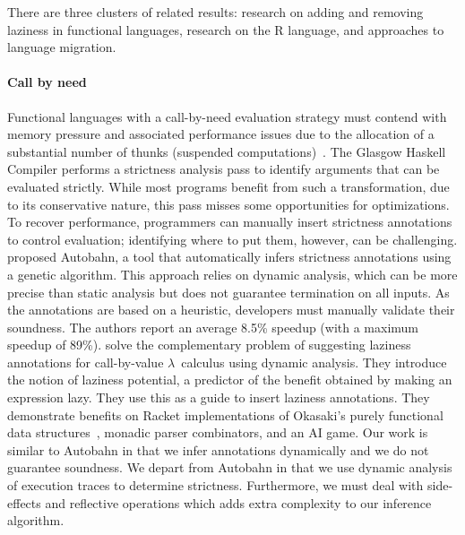 \documentclass[review,screen,acmsmall]{acmart}
\begin{document}
There are three clusters of related results: research on adding and removing
laziness in functional languages, research on the R language, and approaches to
language migration.

\paragraph{Call by need} Functional languages with a call-by-need evaluation
strategy must contend with memory pressure and associated performance issues due
to the allocation of a substantial number of thunks (suspended
computations)~\cite{transformopt,stricteffective,opteval}. The Glasgow Haskell
Compiler performs a strictness analysis pass to identify arguments that can be
evaluated strictly. While most programs benefit from such a transformation, due
to its conservative nature, this pass misses some opportunities for
optimizations. To recover performance, programmers can manually insert
strictness annotations to control evaluation; identifying where to put them,
however, can be challenging. \citet{autobahn} proposed Autobahn, a tool that
automatically infers strictness annotations using a genetic algorithm. This
approach relies on dynamic analysis, which can be more precise than static
analysis but does not guarantee termination on all inputs. As the annotations
are based on a heuristic, developers must manually validate their soundness. The
authors report an average 8.5\% speedup (with a maximum speedup of 89\%).
\citet{lazyprof} solve the complementary problem of suggesting laziness
annotations for call-by-value $\lambda$~calculus using dynamic analysis. They
introduce the notion of laziness potential, a predictor of the benefit obtained
by making an expression lazy. They use this as a guide to insert laziness
annotations. They demonstrate benefits on Racket implementations of Okasaki's
purely functional data structures~\cite{oka95}, monadic parser combinators, and
an AI game. Our work is similar to Autobahn in that we infer annotations
dynamically and we do not guarantee soundness. We depart from Autobahn in that
we use dynamic analysis of execution traces to determine strictness.
Furthermore, we must deal with side-effects and reflective operations which adds
extra complexity to our inference algorithm.
\end{document}
